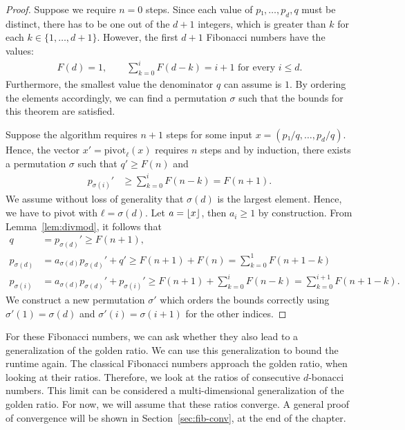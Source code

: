 \begin{proof}
  Suppose we require $n = 0$ steps.
  Since each value of $p₁, …, p_d, q$ must be distinct,
  there has to be one out of the $d+1$ integers,
  which is greater than $k$ for each $k ∈ \{1, …, d+1\}$.
  However, the first $d+1$ Fibonacci numbers have the values:
  \begin{align*}
    F(d) = 1,
    \qquad
    \sum_{k=0}^i F(d - k) = i + 1 \text{ for every } i ≤ d.
  \end{align*}
  Furthermore, the smallest value the denominator $q$ can assume is $1$.
  By ordering the elements accordingly,
  we can find a permutation $σ$ such that
  the bounds for this theorem are satisfied.

  Suppose the algorithm requires $n+1$ steps for some input $x = (p₁/q, …, p_d/q)$.
  Hence, the vector $x' = \mathrm{pivot}_ℓ(x)$ requires $n$ steps and by induction,
  there exists a permutation $σ$ such that $q' ≥ F(n)$ and
  \begin{align*}
    p_{σ(i)}' & ≥ \sum_{k=0}^i F(n - k) = F(n + 1).
  \end{align*}
  We assume without loss of generality that $σ(d)$ is the largest element.
  Hence, we have to pivot with $ℓ = σ(d)$.
  Let $a = \left\lfloor x\right\rfloor$, then $a_i ≥ 1$ by construction.
  From Lemma~\ref{lem:divmod}, it follows that
  \begin{align*}
    q        & = p_{σ(d)}' ≥ F(n+1),                                                   \\
    p_{σ(d)} & = a_{σ(d)} p_{σ(d)}' + q' ≥ F(n + 1) + F(n) = \sum_{k=0}^1 F(n + 1 - k) \\
    p_{σ(i)} & = a_{σ(d)} p_{σ(d)}' + p_{σ(i)}' ≥ F(n + 1) + ∑_{k=0}^i F(n - k) = ∑_{k=0}^{i+1} F(n + 1 - k).
  \end{align*}
  We construct a new permutation $σ'$ which orders the bounds correctly
  using $σ'(1) = σ(d)$ and $σ'(i) = σ(i+1)$ for the other indices.
\end{proof}

For these Fibonacci numbers,
we can ask whether they also lead to a generalization of the golden ratio.
We can use this generalization to bound the runtime again.
The classical Fibonacci numbers approach the golden ratio, when looking at their ratios.
Therefore, we look at the ratios of consecutive $d$-bonacci numbers.
This limit can be considered a multi-dimensional generalization of the golden ratio.
For now, we will assume that these ratios converge.
A general proof of convergence will be shown in Section~\ref{sec:fib-conv}, at the end of the chapter.

